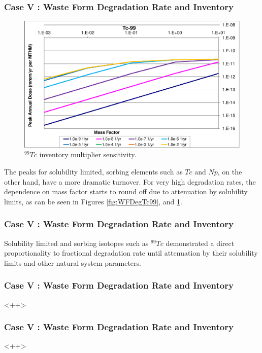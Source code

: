 \begin{frame}[c]
  \frametitle{Case V : Waste Form Degradation Rate and Inventory}
\begin{figure}[ht!]
  \centering
  \includegraphics[width=\linewidth]{99TcMF.eps}
  \caption{$^{99}Tc$ inventory multiplier sensitivity.}
  \label{fig:WFDegTc99MF}
\end{figure}
The peaks for solubility limited, sorbing elements such as $Tc$ and $Np$, on the 
other hand, have a more dramatic turnover.  For very high degradation rates, the 
dependence on mass factor starts to round off due to attenuation by solubility 
limits, as can be seen in Figures 
\ref{fig:WFDegTc99}, and \ref{fig:WFDegTc99MF}.
\end{frame}

\begin{frame}[c]
  \frametitle{Case V : Waste Form Degradation Rate and Inventory}
Solubility limited and sorbing isotopes such as $^{99}Tc$ demonstrated a direct 
proportionality to fractional degradation rate until attenuation by their 
solubility limits and other natural system parameters.  
\end{frame}

  

\begin{frame}[c]
  \frametitle{Case V : Waste Form Degradation Rate and Inventory}
  <++>
\end{frame}

\begin{frame}[c]
  \frametitle{Case V : Waste Form Degradation Rate and Inventory}
  <++>
\end{frame}
